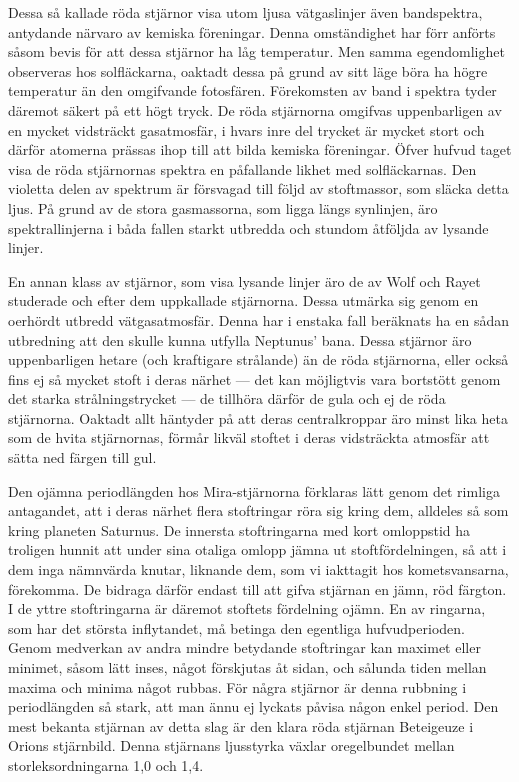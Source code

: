 \documentclass[a4paper, 12pt, oneside, swedish]{article}
\begin{document}
Dessa så kallade röda stjärnor visa utom ljusa vätgaslinjer även bandspektra, antydande närvaro av kemiska föreningar. Denna omständighet har förr anförts såsom bevis för att dessa stjärnor ha låg temperatur. Men samma egendomlighet observeras hos solfläckarna, oaktadt dessa på grund av sitt läge böra ha högre temperatur än den omgifvande fotosfären. Förekomsten av band i spektra tyder däremot säkert på ett högt tryck. De röda stjärnorna omgifvas uppenbarligen av en mycket vidsträckt gasatmosfär, i hvars inre del trycket är mycket stort och därför atomerna prässas ihop till att bilda kemiska föreningar. Öfver hufvud taget visa de röda stjärnornas spektra en påfallande likhet med solfläckarnas. Den violetta delen av spektrum är försvagad till följd av stoftmassor, som släcka detta ljus. På grund av de stora gasmassorna, som ligga längs synlinjen, äro spektrallinjerna i båda fallen starkt utbredda och stundom åtföljda av lysande linjer.

En annan klass av stjärnor, som visa lysande linjer äro de av Wolf och Rayet studerade och efter dem uppkallade stjärnorna. Dessa utmärka sig genom en oerhördt utbredd vätgasatmosfär. Denna har i enstaka fall beräknats ha en sådan utbredning att den skulle kunna utfylla Neptunus' bana. Dessa stjärnor äro uppenbarligen hetare (och kraftigare strålande) än de röda stjärnorna, eller också fins ej så mycket stoft i deras närhet --- det kan möjligtvis vara bortstött genom det starka strålningstrycket --- de tillhöra därför de gula och ej de röda stjärnorna. Oaktadt allt häntyder på att deras centralkroppar äro minst lika heta som de hvita stjärnornas, förmår likväl stoftet i deras vidsträckta atmosfär att sätta ned färgen till gul.

Den ojämna periodlängden hos Mira-stjärnorna förklaras lätt genom det rimliga antagandet, att i deras närhet flera stoftringar röra sig kring dem, alldeles så som kring planeten Saturnus. De innersta stoftringarna med kort omloppstid ha troligen hunnit att under sina otaliga omlopp jämna ut stoftfördelningen, så att i dem inga nämnvärda knutar, liknande dem, som vi iakttagit hos kometsvansarna, förekomma. De bidraga därför endast till att gifva stjärnan en jämn, röd färgton. I de yttre stoftringarna är däremot stoftets fördelning ojämn. En av ringarna, som har det största inflytandet, må betinga den egentliga hufvudperioden. Genom medverkan av andra mindre betydande stoftringar kan maximet eller minimet, såsom lätt inses, något förskjutas åt sidan, och sålunda tiden mellan maxima och minima något rubbas. För några stjärnor är denna rubbning i periodlängden så stark, att man ännu ej lyckats påvisa någon enkel period. Den mest bekanta stjärnan av detta slag är den klara röda stjärnan Beteigeuze i Orions stjärnbild. Denna stjärnans ljusstyrka växlar oregelbundet mellan storleksordningarna 1,0 och 1,4.
\end{document}
